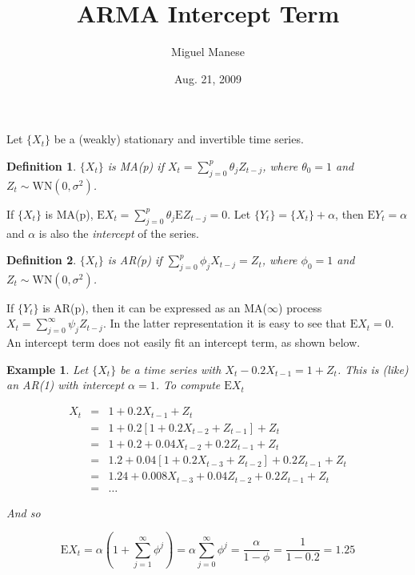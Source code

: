 \documentclass{article}
\title{ARMA Intercept Term}
\author{Miguel Manese}
\date{Aug. 21, 2009}
\newtheorem{definition}{Definition}
\newtheorem{example}{Example}
\newcommand{\Xt}{\{X_{t}\}}
\newcommand{\Yt}{\{Y_{t}\}}
\newcommand{\E}{\mathrm{E}}
\begin{document}
\maketitle

\noindent Let $\Xt$ be a (weakly) stationary and invertible time series.

\begin{definition}\normalfont
$\Xt$ is MA(p) if $X_{t} = \sum_{j=0}^{p} \theta_{j} Z_{t-j}$, where 
$\theta_{0} = 1$ and $Z_{t} \sim \mathrm{WN}(0, \sigma^2)$.
\end{definition}

\noindent 
If $\Xt$ is MA(p), $\E X_{t} = \sum_{j=0}^{p} \theta_{j} \E Z_{t-j} = 0$. 
Let $\Yt = \Xt + \alpha$, then $\E Y_{t} = \alpha$ and $\alpha$ is also the
\textit{intercept} of the series.


\begin{definition}\normalfont
$\Xt$ is AR(p) if $\sum_{j=0}^{p} \phi_{j} X_{t-j} = Z_{t}$, where 
$\phi_{0} = 1$ and $Z_{t} \sim \mathrm{WN}(0, \sigma^2)$.
\end{definition}

\noindent
If $\Yt$ is AR(p), then it can be expressed as an MA($\infty$) process
$X_{t} = \sum_{j=0}^{\infty} \psi_{j} Z_{t-j}$. In the
latter representation it is easy to see that $\E X_{t} = 0$. An intercept term
does not easily fit an intercept term, as shown below.

\begin{example}\label{ex:ar_alpha}\normalfont
Let $\Xt$ be a time series with $X_{t} - 0.2 X_{t-1} = 1 + Z_{t}$. This is 
(like) an \textit{AR(1) with intercept $\alpha = 1$}. To compute $\E X_{t}$

\begin{eqnarray}
X_{t} & = & 1 + 0.2 X_{t-1} + Z_{t} \nonumber\\
         & = & 1 + 0.2 [1 + 0.2 X_{t-2} + Z_{t-1}] + Z_{t} \nonumber\\
         & = & 1 + 0.2 + 0.04 X_{t-2} + 0.2 Z_{t-1} + Z_{t} \nonumber\\
         & = & 1.2 + 0.04 [1 + 0.2 X_{t-3} + Z_{t-2}] + 0.2 Z_{t-1} + Z_{t} \nonumber\\
         & = & 1.24 + 0.008 X_{t-3} + 0.04 Z_{t-2} + 0.2 Z_{t-1} + Z_{t} \nonumber\\
         & = & \ldots \nonumber
\end{eqnarray}

\noindent And so 

\[
\E X_{t}  =  \alpha (1 + \sum_{j=1}^{\infty} \phi^{j} ) 
   =  \alpha \sum_{j=0}^{\infty} \phi^{j} 
   =  \frac{\alpha}{1 - \phi} \nonumber 
   =  \frac{1}{1 - 0.2} = 1.25
\]
\end{example}
\end{document}
